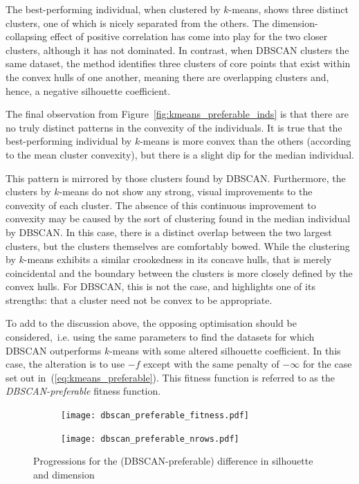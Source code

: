 The best-performing individual, when clustered by \(k\)-means, shows three
distinct clusters, one of which is nicely separated from the others. The
dimension-collapsing effect of positive correlation has come into play for the
two closer clusters, although it has not dominated. In contrast, when DBSCAN
clusters the same dataset, the method identifies three clusters of core points
that exist within the convex hulls of one another, meaning there are overlapping
clusters and, hence, a negative silhouette coefficient.

The final observation from Figure~\ref{fig:kmeans_preferable_inds} is that there
are no truly distinct patterns in the convexity of the individuals. It is true
that the best-performing individual by \(k\)-means is more convex than the
others (according to the mean cluster convexity), but there is a slight dip for
the median individual.

This pattern is mirrored by those clusters found by DBSCAN. Furthermore, the
clusters by \(k\)-means do not show any strong, visual improvements to the
convexity of each cluster. The absence of this continuous improvement to
convexity may be caused by the sort of clustering found in the median individual
by DBSCAN. In this case, there is a distinct overlap between the two largest
clusters, but the clusters themselves are comfortably bowed. While the
clustering by \(k\)-means exhibits a similar crookedness in its concave hulls,
that is merely coincidental and the boundary between the clusters is more
closely defined by the convex hulls. For DBSCAN, this is not the case, and
highlights one of its strengths: that a cluster need not be convex to be
appropriate.

To add to the discussion above, the opposing optimisation should be
considered,~i.e. using the same parameters to find the datasets for which DBSCAN
outperforms \(k\)-means with some altered silhouette coefficient. In this case,
the alteration is to use \(-f\) except with the same penalty of \(-\infty\) for
the case set out in~(\ref{eq:kmeans_preferable}). This fitness function is
referred to as the \emph{DBSCAN-preferable} fitness function.

\begin{figure}[htbp]
    \centering
    \begin{subfigure}{\imgwidth}
        \texttt{[image: dbscan\_preferable\_fitness.pdf]}
    \end{subfigure}

    \begin{subfigure}{\imgwidth}
        \texttt{[image: dbscan\_preferable\_nrows.pdf]}
    \end{subfigure}
    \caption{%
        Progressions for the (DBSCAN-preferable) difference in silhouette and
        dimension
    }\label{fig:dbscan_preferable_progression}
\end{figure}

